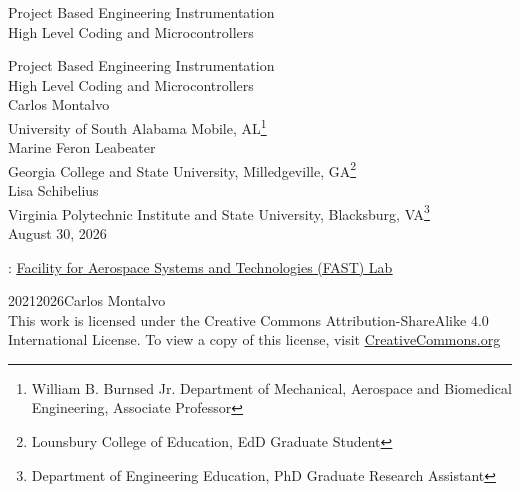 \documentclass[oneside,10pt,]{book}
\newcommand{\titlepagefont}{\relax}
\newcommand{\linkhilite}[1]{\underline{#1}}
\numberwithin{equation}{section}
\begin{document}
\raggedbottom
\frontmatter
\thispagestyle{empty}
{\titlepagefont\centering
\vspace*{0.28\textheight}
{\Huge Project Based Engineering Instrumentation}\\[2\baselineskip]
{\LARGE High Level Coding and Microcontrollers}\\
}
\clearpage
\thispagestyle{empty}
{\titlepagefont\centering
\vspace*{0.14\textheight}
{\Huge Project Based Engineering Instrumentation}\\[\baselineskip]
{\LARGE High Level Coding and Microcontrollers}\\[3\baselineskip]
{\Large Carlos Montalvo}\\[0.5\baselineskip]
{\Large University of South Alabama Mobile, AL\footnote{William B. Burnsed Jr. Department of Mechanical, Aerospace and Biomedical Engineering, Associate Professor\label{frontmatter-1-1-2-1-1}}}\\[3\baselineskip]
{\Large Marine Feron Leabeater}\\[0.5\baselineskip]
{\Large Georgia College and State University, Milledgeville, GA\footnote{Lounsbury College of Education, EdD Graduate Student\label{frontmatter-1-2-2-1-1}}}\\[3\baselineskip]
{\Large Lisa Schibelius}\\[0.5\baselineskip]
{\Large Virginia Polytechnic Institute and State University, Blacksburg, VA\footnote{Department of Engineering Education, PhD Graduate Research Assistant\label{frontmatter-1-3-2-1-1}}}\\[3\baselineskip]
{\Large August 30, 2026}\\}
\clearpage
\thispagestyle{empty}
\hypertarget{front-colophon}{}
: \href{www.aerialsystems.org}{\linkhilite{Facility for Aerospace Systems and Technologies (FAST) Lab}}\par\medskip
\noindent\textcopyright{}2021\textendash{}2026\quad{}Carlos Montalvo\\[0.5\baselineskip]
This work is licensed under the Creative Commons Attribution-ShareAlike 4.0 International License. To view a copy of this license, visit \href{http://creativecommons.org/licenses/by-sa/4.0/}{\linkhilite{CreativeCommons.org}}\par\medskip
\end{document}
